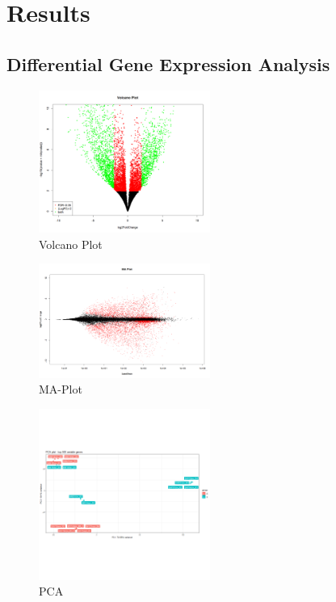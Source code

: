 \chapter{Results}

\section{Differential Gene Expression Analysis}

\begin{figure}[ht]
	\begin{center}
		\includegraphics[width = 0.5\textwidth]{Fig/DE_volcano_human_RvsS_full.png}
	\end{center}
	\caption{Volcano Plot}\label{fig:dge_volc}
\end{figure}

\begin{figure}[ht]
	\begin{center}
		\includegraphics[width = 0.5\textwidth]{Fig/DE_MAplot_human_RvsS_full.png}
	\end{center}
	\caption{MA-Plot}\label{fig:dge_ma}
\end{figure}

\begin{figure}[ht]
	\begin{center}
		\includegraphics[width = 0.5\textwidth]{Fig/PCA_full.png}
	\end{center}
	\caption{PCA}\label{fig:dge_pca}
\end{figure}

